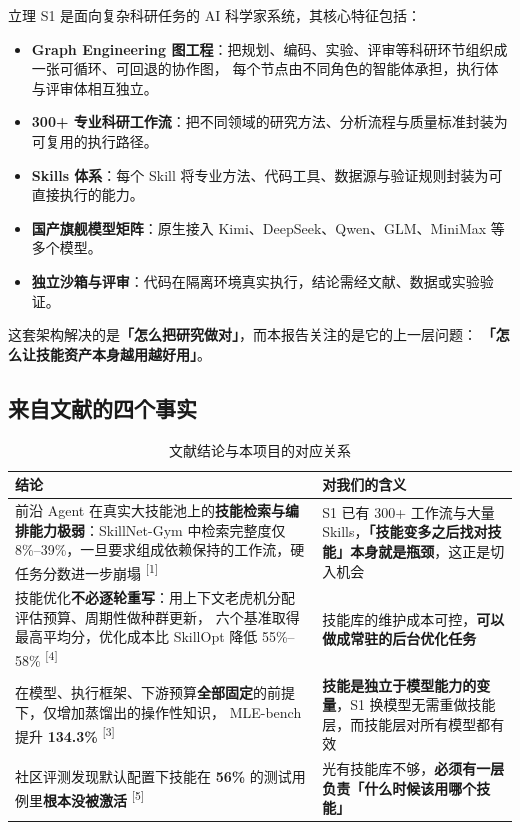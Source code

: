 \documentclass[UTF8, fontset=windows, 11pt, a4paper]{ctexart}
\begin{document}
立理 S1 是面向复杂科研任务的 AI 科学家系统，其核心特征包括：

\begin{itemize}
\item \textbf{Graph Engineering 图工程}：把规划、编码、实验、评审等科研环节组织成一张可循环、可回退的协作图，
      每个节点由不同角色的智能体承担，执行体与评审体相互独立。
\item \textbf{300+ 专业科研工作流}：把不同领域的研究方法、分析流程与质量标准封装为可复用的执行路径。
\item \textbf{Skills 体系}：每个 Skill 将专业方法、代码工具、数据源与验证规则封装为可直接执行的能力。
\item \textbf{国产旗舰模型矩阵}：原生接入 Kimi、DeepSeek、Qwen、GLM、MiniMax 等多个模型。
\item \textbf{独立沙箱与评审}：代码在隔离环境真实执行，结论需经文献、数据或实验验证。
\end{itemize}

这套架构解决的是\textbf{「怎么把研究做对」}，而本报告关注的是它的上一层问题：
\textbf{「怎么让技能资产本身越用越好用」}。

\subsection{来自文献的四个事实}

\begin{table}[h]
\centering
\small
\begin{tabularx}{\textwidth}{@{}>{\raggedright\arraybackslash}p{3.1cm} >{\raggedright\arraybackslash}X@{}}
\toprule
\textbf{结论} & \textbf{对我们的含义} \\
\midrule
前沿 Agent 在真实大技能池上的\textbf{技能检索与编排能力极弱}：SkillNet-Gym 中检索完整度仅
8\%–39\%，一旦要求组成依赖保持的工作流，硬任务分数进一步崩塌
\textsuperscript{[1]} &
S1 已有 300+ 工作流与大量 Skills，\textbf{「技能变多之后找对技能」本身就是瓶颈}，这正是切入机会 \\[0.25em]
技能优化\textbf{不必逐轮重写}：用上下文老虎机分配评估预算、周期性做种群更新，
六个基准取得最高平均分，优化成本比 SkillOpt 降低 55\%–58\%
\textsuperscript{[4]} &
技能库的维护成本可控，\textbf{可以做成常驻的后台优化任务} \\[0.25em]
在模型、执行框架、下游预算\textbf{全部固定}的前提下，仅增加蒸馏出的操作性知识，
MLE-bench 提升 \textbf{134.3\%}
\textsuperscript{[3]} &
\textbf{技能是独立于模型能力的变量}，S1 换模型无需重做技能层，而技能层对所有模型都有效 \\[0.25em]
社区评测发现默认配置下技能在 \textbf{56\%} 的测试用例里\textbf{根本没被激活}
\textsuperscript{[5]} &
光有技能库不够，\textbf{必须有一层负责「什么时候该用哪个技能」} \\
\bottomrule
\end{tabularx}
\caption{文献结论与本项目的对应关系}
\end{table}
\end{document}

